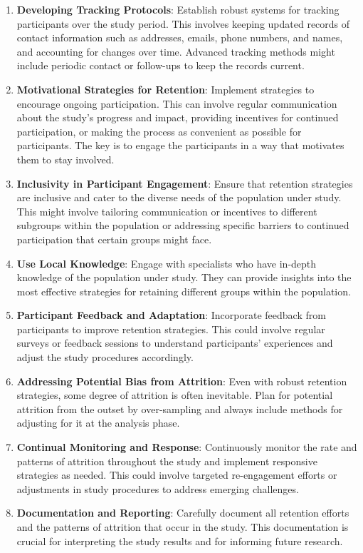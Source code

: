\documentclass[
  singlecolumn,
  9pt]{article}
\begin{document}
\begin{enumerate}
\def\labelenumi{\arabic{enumi}.}
\item
  \textbf{Developing Tracking Protocols}: Establish robust systems for
  tracking participants over the study period. This involves keeping
  updated records of contact information such as addresses, emails,
  phone numbers, and names, and accounting for changes over time.
  Advanced tracking methods might include periodic contact or follow-ups
  to keep the records current.
\item
  \textbf{Motivational Strategies for Retention}: Implement strategies
  to encourage ongoing participation. This can involve regular
  communication about the study's progress and impact, providing
  incentives for continued participation, or making the process as
  convenient as possible for participants. The key is to engage the
  participants in a way that motivates them to stay involved.
\item
  \textbf{Inclusivity in Participant Engagement}: Ensure that retention
  strategies are inclusive and cater to the diverse needs of the
  population under study. This might involve tailoring communication or
  incentives to different subgroups within the population or addressing
  specific barriers to continued participation that certain groups might
  face.
\item
  \textbf{Use Local Knowledge}: Engage with specialists who have
  in-depth knowledge of the population under study. They can provide
  insights into the most effective strategies for retaining different
  groups within the population.
\item
  \textbf{Participant Feedback and Adaptation}: Incorporate feedback
  from participants to improve retention strategies. This could involve
  regular surveys or feedback sessions to understand participants'
  experiences and adjust the study procedures accordingly.
\item
  \textbf{Addressing Potential Bias from Attrition}: Even with robust
  retention strategies, some degree of attrition is often inevitable.
  Plan for potential attrition from the outset by over-sampling and
  always include methods for adjusting for it at the analysis phase.
\item
  \textbf{Continual Monitoring and Response}: Continuously monitor the
  rate and patterns of attrition throughout the study and implement
  responsive strategies as needed. This could involve targeted
  re-engagement efforts or adjustments in study procedures to address
  emerging challenges.
\item
  \textbf{Documentation and Reporting}: Carefully document all retention
  efforts and the patterns of attrition that occur in the study. This
  documentation is crucial for interpreting the study results and for
  informing future research.
\end{enumerate}
\end{document}
